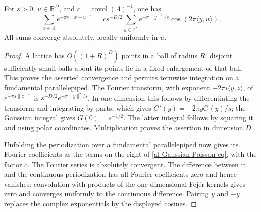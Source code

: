 \begin{lemma}\label{al-Gaussian-Poisson}
For $s>0$, $u\in\mathbb R^D$, and
$c=\operatorname{covol}(\Lambda)^{-1}$, one has
\begin{equation}\label{al-Gaussian-Poisson-eq}
 \sum_{x\in\Lambda}e^{-\pi s\|x-u\|^2}
 =c s^{-D/2}\sum_{y\in\Lambda^*}
       e^{-\pi\|y\|^2/s}\cos(2\pi\langle y,u\rangle).
\end{equation}
All sums converge absolutely, locally uniformly in $u$.
\end{lemma}
\begin{proof}
A lattice has $O((1+R)^D)$ points in a ball of radius $R$:
disjoint sufficiently small balls about its points lie in a fixed
enlargement of that ball. This proves the asserted convergence
and permits termwise integration on a fundamental parallelepiped.
The Fourier transform, with exponent $-2\pi i\langle y,z\rangle$,
of $e^{-\pi s\|z\|^2}$ is
$s^{-D/2}e^{-\pi\|y\|^2/s}$. In one dimension this follows by
differentiating the transform and integrating by parts, which
gives $G'(y)=-2\pi yG(y)/s$; the Gaussian integral gives
$G(0)=s^{-1/2}$. The latter integral follows by squaring it and
using polar coordinates. Multiplication proves the assertion in
dimension $D$.

Unfolding the periodization over a fundamental parallelepiped
now gives its Fourier coefficients as the terms on the right
of \eqref{al-Gaussian-Poisson-eq}, with the factor $c$.
The Fourier series is absolutely convergent. The difference
between it and the continuous periodization has all Fourier
coefficients zero and hence vanishes: convolution with products
of the one-dimensional Fej\'er kernels gives zero and converges
uniformly to the continuous difference. Pairing $y$ and $-y$
replaces the complex exponentials by the displayed cosines.
\end{proof}

